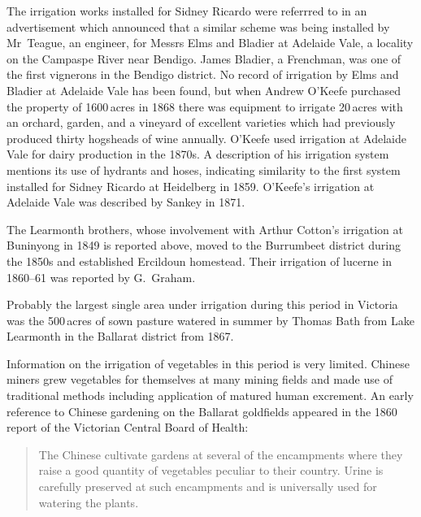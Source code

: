 The irrigation works installed for Sidney Ricardo were referrred to in
an advertisement which announced that a similar scheme was being
installed by Mr~Teague, an engineer, for Messrs Elms and Bladier at
Adelaide Vale, a locality on the Campaspe River 
near Bendigo.  James Bladier,  a
Frenchman, was one of the first vignerons  in the
Bendigo district.  No record of irrigation by Elms and Bladier at
Adelaide Vale  has been found, but when Andrew
O'Keefe  purchased the property of 1600\,acres in 1868
there was equipment to irrigate 20\,acres with an orchard,
 garden,  and a
vineyard  of excellent varieties which had previously
produced thirty hogsheads of wine annually.  O'Keefe used irrigation
at Adelaide Vale for dairy  production in the 1870s.  A
description of his irrigation system mentions its use of hydrants and
hoses, indicating similarity to the first system installed for Sidney
Ricardo at Heidelberg in 1859.  O'Keefe's irrigation at Adelaide Vale
was described by Sankey in 1871.

The Learmonth brothers,  whose involvement with
Arthur Cotton's irrigation at Buninyong in 1849 is reported above,
moved to the Burrumbeet  district during the 1850s
and established Ercildoun  homestead. Their
irrigation of lucerne  in 1860--61 was reported by
G.~Graham.

Probably the largest single area under irrigation during this period
in Victoria was the 500\,acres of sown pasture watered in summer by
Thomas Bath \index{Bath, T.} from Lake Learmonth
 in the Ballarat 
district from 1867.

Information on the irrigation of vegetables in this period is very
limited.  Chinese miners \index{Chinese} grew vegetables for
themselves at many mining fields and made use of traditional methods
including application of matured human excrement.  An early reference to Chinese gardening on the Ballarat
goldfields appeared in the 1860 report of the Victorian Central Board
of Health:
\begin{quote}
	The Chinese cultivate gardens at several of the encampments
	where they raise a good quantity of vegetables peculiar to
	their country.  Urine is carefully preserved at such
	encampments and is universally used for watering the
	plants.
\end{quote}

